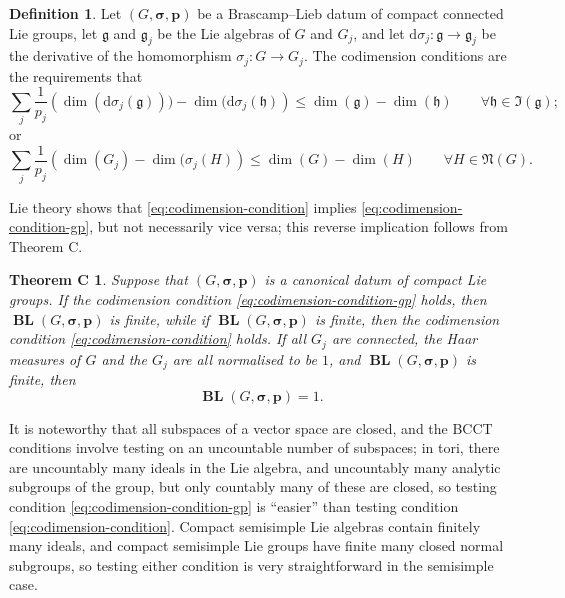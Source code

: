 \documentclass[12pt,twoside,a4paper]{amsart}
\newtheorem*{thmC}{Theorem C}
\theoremstyle{definition}
\newtheorem{defn}[thm]{Definition}%
\theoremstyle{remark}
\numberwithin{equation}{section}
\newcommand{\Lie}[1]{\mathfrak{#1}}
\newcommand{\BL}{\operatorname{\mathbf{BL}}}
\newcommand{\bss}{\boldsymbol{\sigma}}
\newcommand{\bsp}{\boldsymbol{p}}
\newcommand{\lpar}{\left( }
\newcommand{\rpar}{\right) }
\begin{document}
\begin{defn}
Let $(G,\bss,\bsp)$ be a Brascamp--Lieb datum of compact connected Lie groups, let $\Lie{g}$ and $\Lie{g}_j$ be the Lie algebras of $G$ and $G_j$, and let $\mathrm{d}\sigma_j\colon  \Lie{g} \to \Lie{g}_j$ be the derivative of the homomorphism $\sigma_j\colon  G \to G_j$.
The codimension conditions are the requirements that 
\begin{equation}\label{eq:codimension-condition}
\sum_j \frac{1}{p_j} \lpar \dim(\mathrm{d}\sigma_j(\Lie{g})))  - \dim( \mathrm{d}\sigma_j (\Lie{h} ) \rpar  
\leq  \dim(\Lie{g}) - \dim(\Lie{h})
\qquad\forall \Lie{h} \in \Lie{I}(\Lie{g});
\end{equation}
or
\begin{equation}\label{eq:codimension-condition-gp}
\sum_j \frac{1}{p_j} \lpar \dim(G_j)  - \dim( \sigma_j (H ) \rpar  
\leq  \dim(G) - \dim(H)
\qquad\forall H \in \Lie{N}(G).
\end{equation}
\end{defn}

Lie theory shows that \eqref{eq:codimension-condition} implies \eqref{eq:codimension-condition-gp}, but not necessarily vice versa; this reverse implication follows from Theorem C.


\begin{thmC}
Suppose that $(G,\bss,\bsp)$ is a canonical datum of compact Lie groups.
If the codimension condition \eqref{eq:codimension-condition-gp} holds, then $\BL(G,\bss,\bsp)$ is finite, while if $\BL(G,\bss,\bsp)$ is finite, then the codimension condition \eqref{eq:codimension-condition} holds.
If all $G_j$ are connected, the Haar measures of $G$ and the $G_j$ are all normalised to be $1$, and $\BL(G,\bss,\bsp)$ is finite, then 
\[
\BL(G, \bss, \bsp)=1.
\]
\end{thmC}

It is noteworthy that all subspaces of a vector space are closed, and the BCCT conditions involve testing on an uncountable number of subspaces;
in tori, there are uncountably many ideals in the Lie algebra, and uncountably many analytic subgroups of the group, but only countably many of these are closed, so testing condition \eqref{eq:codimension-condition-gp} is ``easier'' than testing condition \eqref{eq:codimension-condition}.
Compact semisimple Lie algebras contain finitely many ideals, and compact semisimple Lie groups have finite many closed normal subgroups, so testing either condition  is very straightforward in the semisimple case.
\end{document}
